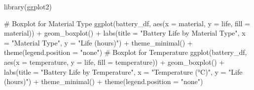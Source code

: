 \documentclass[
  letterpaper,
]{scrbook}
\newenvironment{Shaded}{\begin{snugshade}}{\end{snugshade}}
\newcommand{\AttributeTok}[1]{\textcolor[rgb]{0.40,0.45,0.13}{#1}}
\newcommand{\CommentTok}[1]{\textcolor[rgb]{0.37,0.37,0.37}{#1}}
\newcommand{\FunctionTok}[1]{\textcolor[rgb]{0.28,0.35,0.67}{#1}}
\newcommand{\NormalTok}[1]{\textcolor[rgb]{0.00,0.23,0.31}{#1}}
\newcommand{\SpecialCharTok}[1]{\textcolor[rgb]{0.37,0.37,0.37}{#1}}
\newcommand{\StringTok}[1]{\textcolor[rgb]{0.13,0.47,0.30}{#1}}
\begin{document}
\begin{Shaded}
\begin{Highlighting}[]
\FunctionTok{library}\NormalTok{(ggplot2)}

\CommentTok{\# Boxplot for Material Type}
\FunctionTok{ggplot}\NormalTok{(battery\_df, }\FunctionTok{aes}\NormalTok{(}\AttributeTok{x =}\NormalTok{ material, }\AttributeTok{y =}\NormalTok{ life, }\AttributeTok{fill =}\NormalTok{ material)) }\SpecialCharTok{+}
  \FunctionTok{geom\_boxplot}\NormalTok{() }\SpecialCharTok{+}
  \FunctionTok{labs}\NormalTok{(}\AttributeTok{title =} \StringTok{"Battery Life by Material Type"}\NormalTok{, }\AttributeTok{x =} \StringTok{"Material Type"}\NormalTok{, }\AttributeTok{y =} \StringTok{"Life (hours)"}\NormalTok{) }\SpecialCharTok{+}
  \FunctionTok{theme\_minimal}\NormalTok{() }\SpecialCharTok{+}
  \FunctionTok{theme}\NormalTok{(}\AttributeTok{legend.position =} \StringTok{"none"}\NormalTok{)}
\CommentTok{\# Boxplot for Temperature}
\FunctionTok{ggplot}\NormalTok{(battery\_df, }\FunctionTok{aes}\NormalTok{(}\AttributeTok{x =}\NormalTok{ temperature, }\AttributeTok{y =}\NormalTok{ life, }\AttributeTok{fill =}\NormalTok{ temperature)) }\SpecialCharTok{+}
  \FunctionTok{geom\_boxplot}\NormalTok{() }\SpecialCharTok{+}
  \FunctionTok{labs}\NormalTok{(}\AttributeTok{title =} \StringTok{"Battery Life by Temperature"}\NormalTok{, }\AttributeTok{x =} \StringTok{"Temperature (°C)"}\NormalTok{, }\AttributeTok{y =} \StringTok{"Life (hours)"}\NormalTok{) }\SpecialCharTok{+}
  \FunctionTok{theme\_minimal}\NormalTok{() }\SpecialCharTok{+}
  \FunctionTok{theme}\NormalTok{(}\AttributeTok{legend.position =} \StringTok{"none"}\NormalTok{)}
\end{Highlighting}
\end{Shaded}
\end{document}
